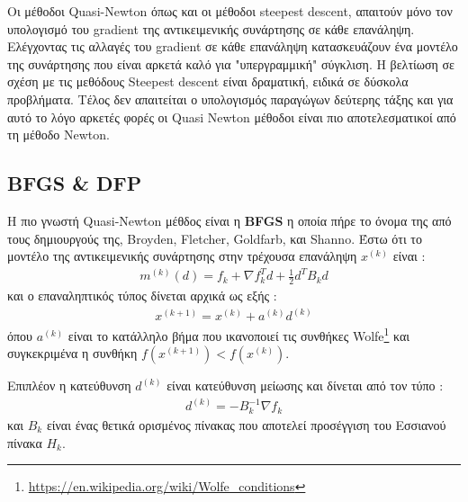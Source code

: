 \documentclass[a4paper,12pt,twoside]{report}
\theoremstyle{plain}
\theoremstyle{definition}
\theoremstyle{remark}
\begin{document}
Οι μέθοδοι Quasi-Newton όπως και οι μέθοδοι steepest descent, απαιτούν μόνο τον υπολογισμό του gradient της αντικειμενικής συνάρτησης σε κάθε επανάληψη. Ελέγχοντας τις αλλαγές του gradient σε κάθε επανάληψη κατασκευάζουν ένα μοντέλο της συνάρτησης που είναι αρκετά καλό για "υπεργραμμική" σύγκλιση. Η βελτίωση σε σχέση με τις μεθόδους Steepest descent είναι δραματική, ειδικά σε δύσκολα προβλήματα. Τέλος δεν απαιτείται ο υπολογισμός παραγώγων δεύτερης τάξης και για αυτό το λόγο αρκετές φορές οι Quasi Newton μέθοδοι είναι πιο αποτελεσματικοί από τη μέθοδο Newton\cite{nocedal2006numerical}.


\subsection{BFGS \& DFP}
H πιο γνωστή Quasi-Newton μέθδος είναι η \textbf{BFGS} η οποία πήρε το όνομα της από τους δημιουργούς της, Broyden, Fletcher, Goldfarb, και Shanno. Έστω ότι το μοντέλο της αντικειμενικής συνάρτησης στην τρέχουσα επανάληψη $x^{(k)}$ είναι :
\begin{align}
m^{(k)}(d) = f_k + \nabla f_k^Td+\frac{1}{2}d^TB_kd
\end{align}
και ο επαναληπτικός τύπος  δίνεται αρχικά ως εξής :
\begin{align}
x^{(k+1)} = x^{(k)} + a^{(k)}d^{(k)}
\end{align}
όπου $a^{(k)}$ είναι το κατάλληλο βήμα που ικανοποιεί τις συνθήκες Wolfe\footnote{\url{https://en.wikipedia.org/wiki/Wolfe\_conditions}} και συγκεκριμένα η συνθήκη $f(x^{(k+1)}) < f(x^{(k)})$. 

Επιπλέον η κατεύθυνση $d^{(k)}$ είναι κατεύθυνση μείωσης και δίνεται από τον τύπο :
\begin{align}
d^{(k)} = -B_k^{-1}\nabla f_k
\end{align}
και $B_k$ είναι ένας θετικά ορισμένος πίνακας που αποτελεί προσέγγιση του Εσσιανού πίνακα $H_k$.
\end{document}
